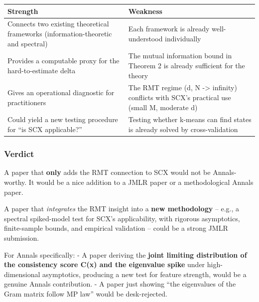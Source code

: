 \documentclass[
  12pt,
]{article}
\begin{document}
\begin{longtable}[]{@{}
  >{\raggedright\arraybackslash}p{}
  >{\raggedright\arraybackslash}p{}@{}}
\toprule\noalign{}
\begin{minipage}[b]{\linewidth}\raggedright
Strength
\end{minipage} & \begin{minipage}[b]{\linewidth}\raggedright
Weakness
\end{minipage} \\
\midrule\noalign{}
\endhead
\bottomrule\noalign{}
\endlastfoot
Connects two existing theoretical frameworks (information-theoretic and
spectral) & Each framework is already well-understood individually \\
Provides a computable proxy for the hard-to-estimate delta & The mutual
information bound in Theorem 2 is already sufficient for the theory \\
Gives an operational diagnostic for practitioners & The RMT regime (d, N
-\textgreater{} infinity) conflicts with SCX's practical use (small M,
moderate d) \\
Could yield a new testing procedure for ``is SCX applicable?'' & Testing
whether k-means can find states is already solved by cross-validation \\
\end{longtable}

\subsubsection{Verdict}\label{verdict}

A paper that \textbf{only} adds the RMT connection to SCX would not be
Annals-worthy. It would be a nice addition to a JMLR paper or a
methodological Annals paper.

A paper that \emph{integrates} the RMT insight into a \textbf{new
methodology} -- e.g., a spectral spiked-model test for SCX's
applicability, with rigorous asymptotics, finite-sample bounds, and
empirical validation -- could be a strong JMLR submission.

For Annals specifically: - A paper deriving the \textbf{joint limiting
distribution of the consistency score C(x) and the eigenvalue spike}
under high-dimensional asymptotics, producing a new test for feature
strength, would be a genuine Annals contribution. - A paper just showing
``the eigenvalues of the Gram matrix follow MP law'' would be
desk-rejected.
\end{document}
